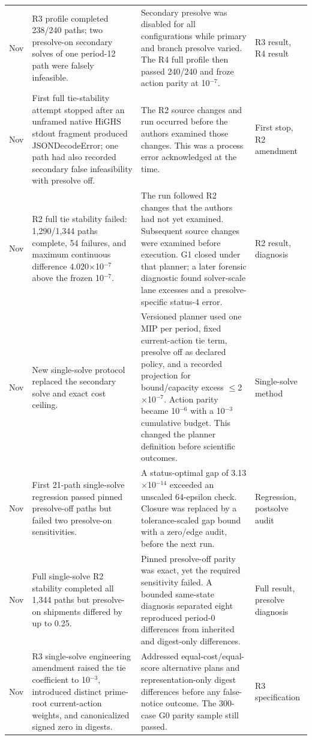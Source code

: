 \documentclass[preprint,11pt,authoryear]{elsarticle}
\begin{document}
\begin{longtable}{>{\raggedright\arraybackslash}p{1.1cm}>{\raggedright\arraybackslash}p{4.6cm}>{\raggedright\arraybackslash}p{6.2cm}>{\raggedright\arraybackslash}p{2.7cm}}
12 Nov & R3 profile completed 238/240 paths; two presolve-on secondary solves of one period-12 path were falsely infeasible. & Secondary presolve was disabled for all configurations while primary and branch presolve varied. The R4 full profile then passed 240/240 and froze action parity at 10$^{-7}$. & R3 result, R4 result \\
12 Nov & First full tie-stability attempt stopped after an unframed native HiGHS stdout fragment produced JSONDecodeError; one path had also recorded secondary false infeasibility with presolve off. & The R2 source changes and run occurred before the authors examined those changes. This was a process error acknowledged at the time. & First stop, R2 amendment \\
12 Nov & R2 full tie stability failed: 1,290/1,344 paths complete, 54 failures, and maximum continuous difference 4.020$\times$10$^{-7}$ above the frozen 10$^{-7}$. & The run followed R2 changes that the authors had not yet examined. Subsequent source changes were examined before execution. G1 closed under that planner; a later forensic diagnostic found solver-scale lane excesses and a presolve-specific status-4 error. & R2 result, diagnosis \\
12 Nov & New single-solve protocol replaced the secondary solve and exact cost ceiling. & Versioned planner used one MIP per period, fixed current-action tie term, presolve off as declared policy, and a recorded projection for bound/capacity excess $\leq$2$\times$10$^{-7}$. Action parity became 10$^{-6}$ with a 10$^{-3}$ cumulative budget. This changed the planner definition before scientific outcomes. & Single-solve method \\
12 Nov & First 21-path single-solve regression passed pinned presolve-off paths but failed two presolve-on sensitivities. & A status-optimal gap of 3.13$\times$10$^{-14}$ exceeded an unscaled 64-epsilon check. Closure was replaced by a tolerance-scaled gap bound with a zero/edge audit, before the next run. & Regression, postsolve audit \\
12 Nov & Full single-solve R2 stability completed all 1,344 paths but presolve-on shipments differed by up to 0.25. & Pinned presolve-off parity was exact, yet the required sensitivity failed. A bounded same-state diagnosis separated eight reproduced period-0 differences from inherited and digest-only differences. & Full result, presolve diagnosis \\
13 Nov & R3 single-solve engineering amendment raised the tie coefficient to 10$^{-3}$, introduced distinct prime-root current-action weights, and canonicalized signed zero in digests. & Addressed equal-cost/equal-score alternative plans and representation-only digest differences before any false-notice outcome. The 300-case G0 parity sample still passed. & R3 specification \\

\end{longtable}
\end{document}
